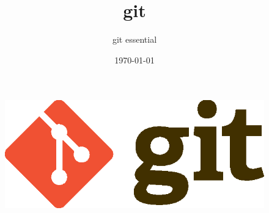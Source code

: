\documentclass{beamer}
\title{git}
\subtitle{git essential}
\date{\today}
\begin{document}
\begin{frame}
    \begin{figure}
        \center
        \includegraphics{git-logo.eps}
        \label{fig:git-logo}
    \end{figure}
\end{frame}
\end{document}
